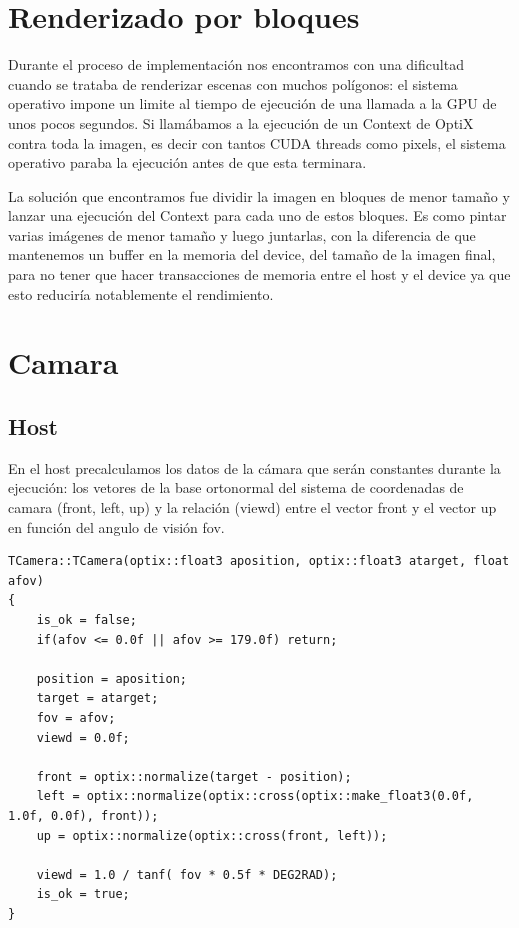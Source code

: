 \clearpage

\section{Renderizado por bloques}

Durante el proceso de implementación nos encontramos con una dificultad cuando se trataba de renderizar escenas con muchos polígonos: el sistema operativo impone un limite al tiempo de ejecución de una llamada a la GPU de unos pocos segundos. Si llamábamos a la ejecución de un Context de OptiX contra toda la imagen, es decir con tantos CUDA threads como pixels, el sistema operativo paraba la ejecución antes de que esta terminara.

\medskip

La solución que encontramos fue dividir la imagen en bloques de menor tamaño y lanzar una ejecución del Context para cada uno de estos bloques. Es como pintar varias imágenes de menor tamaño y luego juntarlas, con la diferencia de que mantenemos un buffer en la memoria del device, del tamaño de la imagen final, para no tener que hacer transacciones de memoria entre el host y el device ya que esto reduciría notablemente el rendimiento.

\clearpage

\section{Camara}

\subsection{Host}

En el host precalculamos los datos de la cámara que serán constantes durante la ejecución: los vetores de la base ortonormal del sistema de coordenadas de camara (front, left, up) y la relación (viewd) entre el vector front y el vector up en función del angulo de visión fov.

\begin{lstlisting}
TCamera::TCamera(optix::float3 aposition, optix::float3 atarget, float afov)
{
	is_ok = false;
	if(afov <= 0.0f || afov >= 179.0f) return;

	position = aposition;
	target = atarget;
	fov = afov;
	viewd = 0.0f;

	front = optix::normalize(target - position);
	left = optix::normalize(optix::cross(optix::make_float3(0.0f, 1.0f, 0.0f), front));
	up = optix::normalize(optix::cross(front, left));

	viewd = 1.0 / tanf( fov * 0.5f * DEG2RAD);
	is_ok = true;		
}
\end{lstlisting}


